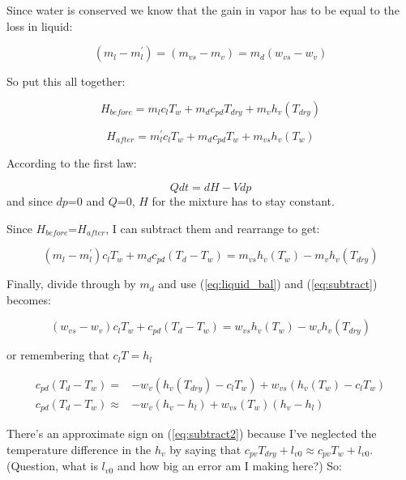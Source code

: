 \documentclass[12pt]{article}
\begin{document}
Since water is conserved we know that the gain in vapor has to be equal to the
loss in liquid:

\begin{equation}
  \label{eq:liquid_bal}
  (m_l - m_l^\prime ) = (m_{vs} - m_v) = m_d ( w_{vs} - w_v )
\end{equation}


So put this all together:

\begin{equation}
  \label{eq:hdry}
H_{before} = m_l c_l T_w + m_d c_{pd} T_{dry} + m_v h_v(T_{dry})
\end{equation}

\begin{equation}
  \label{eq:twet}
H_{after}=  m_l^\prime c_l T_w + m_d c_{pd} T_w + m_{vs} h_v(T_w)
\end{equation}


According to the first law:

\begin{equation}
  \label{eq:first}
  Q dt = dH - V dp
\end{equation}
and since $dp$=0 and $Q$=0, $H$ for the mixture has to stay constant.

Since $H_{before}$=$H_{after}$, I can subtract them and rearrange to get:

\begin{equation}
  \label{eq:subtract}
(m_l - m_l^\prime) c_l T_w + m_d c_{pd} (T_d - T_w)
= m_{vs} h_v(T_w) - m_v h_v(T_{dry})
\end{equation}

Finally, divide through by $m_d$ and  use (\ref{eq:liquid_bal})  and (\ref{eq:subtract}) becomes:

\begin{equation}
  \label{eq:subtract2}
(w_{vs} - w_v) c_l T_w +  c_{pd} (T_d - T_w)
= w_{vs} h_v(T_w) - w_v h_v(T_{dry})
\end{equation}

or remembering that $c_l T = h_l$

\begin{align}
  \label{eq:subtract2}
  c_{pd} (T_d - T_w)
=& -w_v (h_v(T_{dry}) - c_l T_w) + w_{vs} (h_v(T_w) -  c_lT_w) \nonumber\\
  c_{pd} (T_d - T_w) \approx&   -w_v (h_v - h_l) + w_{vs}(T_w) (h_v - h_l)
\end{align}



There's an approximate sign on (\ref{eq:subtract2}) because I've neglected the temperature
difference in the $h_v$  by saying that $c_{pv} T_{dry} + l_{v0} \approx c_{pv} T_{w} + l_{v0}$.
(Question, what is $l_{v0}$ and how big an error am I making here?)  So:
\end{document}
